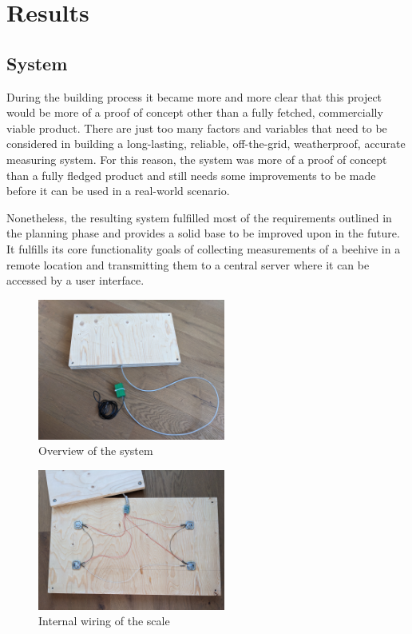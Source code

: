 \chapter{Results}
\section{System}
During the building process it became more and more clear that this project would be more of a proof of concept other than a fully fetched, commercially viable product. There are just too many factors and variables that need to be considered in building a long-lasting, reliable, off-the-grid, weatherproof, accurate measuring system. For this reason, the system was more of a proof of concept than a fully fledged product and still needs some improvements to be made before it can be used in a real-world scenario.

Nonetheless, the resulting system fulfilled most of the requirements outlined in the planning phase and provides a solid base to be improved upon in the future. It fulfills its core functionality goals of collecting measurements of a beehive in a remote location and transmitting them to a central server where it can be accessed by a user interface. 

\begin{figure}
    \centering
    \includegraphics[width=0.55\textwidth]{figures/scale.jpg}
    \caption{Overview of the system}
    \label{fig:overview}
\end{figure}

\begin{figure}
    \centering
    \includegraphics[width=0.55\textwidth]{figures/scale_wiring.jpg}
    \caption{Internal wiring of the scale}
    \label{fig:overview}
\end{figure}

